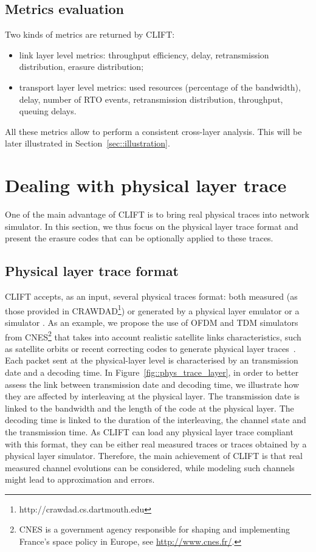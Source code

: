 \documentclass[conference,letterpaper]{IEEEtran}
\begin{document}
\subsection{Metrics evaluation}
\label{subsec::arch_soft_metrics}

Two kinds of metrics are returned by CLIFT:

\begin{itemize} 
\item link layer level metrics: throughput efficiency, delay, retransmission distribution, erasure distribution;
\item transport layer level metrics: used resources (percentage of the bandwidth), delay, number of RTO events, retransmission  distribution, throughput,  queuing delays.
\end{itemize}

All these metrics allow to perform a consistent cross-layer analysis. This will be later illustrated in Section~\ref{sec::illustration}.

\section{Dealing with physical layer trace}
\label{sec::link_layer}

One of the main advantage of CLIFT is to bring real physical traces into network simulator. In this section, we thus focus on the physical layer trace format and present the erasure codes that can be optionally applied to these traces.

\subsection{Physical layer trace format}
\label{subsec::phys_trace}

CLIFT accepts, as an input, several physical traces format: both measured (as those provided in CRAWDAD\footnote{http://crawdad.cs.dartmouth.edu}) or generated by a physical layer emulator \cite{judd04} or a simulator \cite{ns-3}. As an example, we propose the use of OFDM and TDM simulators from CNES\footnote{CNES is a government agency responsible for shaping and implementing France's space policy in Europe, see \url{http://www.cnes.fr/}.} that takes into account realistic satellite links characteristics, such as satellite orbits or recent correcting codes to generate physical layer traces~\cite{use_ofdm}. Each packet sent at the physical-layer level is characterised by an transmission date and a decoding time. In Figure~\ref{fig::phys_trace_layer}, in order to better assess the link between transmission date and decoding time, we illustrate how they are affected by interleaving at the physical layer. The transmission date is linked to the bandwidth and the length of the code at the physical layer. The decoding time is linked to the duration of the interleaving, the channel state and the transmission time. As CLIFT can load any physical layer trace compliant with this format, they can be either real measured traces or traces obtained by a physical layer simulator. Therefore, the main achievement of CLIFT is that real measured channel evolutions can be considered, while modeling such channels might lead to approximation and errors.
\end{document}
